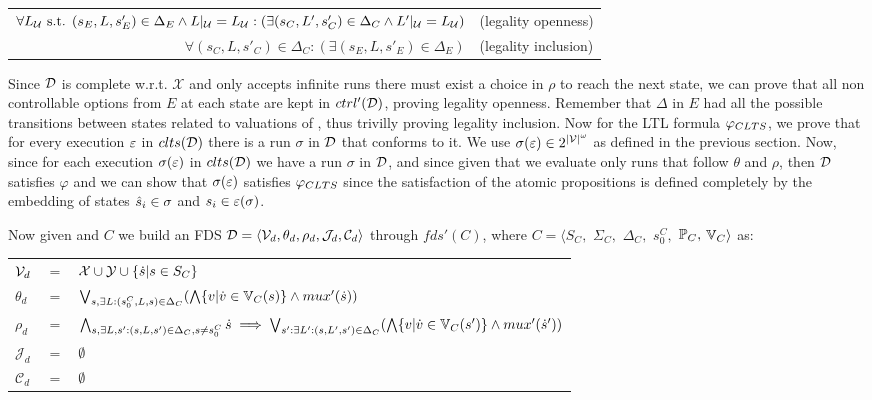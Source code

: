 \begin{center}
	\begin{tabular}{r l}
		
		$\forall L_{\mathcal{U}}\text{ s.t. }(s_E, L, s'_E) \in \Delta_E \wedge L|_{\mathcal{U}} = L_{\mathcal{U}}:( \exists (s_C, L', s'_C) \in \Delta_C \wedge L'|_{\mathcal{U}} = L_{\mathcal{U}})$ &(legality openness)\\
		$\forall (s_C, L, s'_C) \in \Delta_C: ( \exists (s_E, L, s'_E) \in \Delta_E)$& (legality inclusion)\\
	\end{tabular}
\end{center}

Since $\mathcal{D}$ is complete w.r.t. $\mathcal{X}$ and only accepts infinite runs there must exist a choice in $\rho$ to reach the next state, we can prove that all non controllable options from $E$ at each state are kept in $ctrl'(\mathcal{D})$, proving legality openness. Remember that $\Delta$ in $E$ had all the possible transitions between states related to valuations of \gsV, thus trivilly proving legality inclusion.
Now for the LTL formula $\varphi_{CLTS}$, we prove that for every execution $\varepsilon$ in $clts(\mathcal{D})$ there is a run $\sigma$ in $\mathcal{D}$ that conforms to it. We use $\sigma(\varepsilon) \in 2^{|\mathcal{V}|^{\omega}}$ as defined in the previous section.
Now, since for each execution $\sigma(\varepsilon)$ in $clts(\mathcal{D})$ we have a run $\sigma$ in $\mathcal{D}$, and since given that we evaluate only runs that follow $\theta$ and $\rho$, then $\mathcal{D}$ satisfies $\varphi$ and we can show that $\sigma(\varepsilon)$ satisfies $\varphi_{CLTS}$ since the satisfaction of the atomic propositions is defined completely by the embedding of states $\hat{s}_{i} \in \sigma$ and $s_i \in \varepsilon(\sigma)$.

Now given \cltsCPEmbeddingDef and $C$ we build an FDS $\mathcal{D}=\langle \mathcal V_d, \theta_d, \rho_d, \mathcal{J}_d, \mathcal{C}_d \rangle$ through $fds'(C)$, where $C=\langle S_C,$ $\Sigma_C,$ $\Delta_C,$ $s_0^C,$ $\mathbb{P}_C,$ $\mathbb{V}_C\rangle$ as:

\begin{tabular}{ l c l }
	${\mathcal{V}}_d$ & $=$ & ${\mathcal{X}} \cup {\ensuremath{\mathcal{Y}}} \cup \{\dot{s}| s \in S_C\}$\\	
	$\theta_d$ & $=$ & $\bigvee_{s,\exists L:(s_0^C,L,s)\in\Delta_C}(\bigwedge\{ v | \dot{v}\in \mathbb{V}_C(s)\}\wedge mux'(\dot{s}) )$\\
	$\rho_d$ & $=$ &$\bigwedge_{s,\exists L,s':(s,L,s')\in \Delta_C, s\neq s_0^C}\dot{s}\implies\bigvee_{s':\exists L':(s,L',s')\in \Delta_C}(\bigwedge\{v | \dot{v}\in \mathbb{V}_C(s') \}\wedge mux'(\dot{s}'))$\\	
	$\mathcal{J}_d$ & $=$ & $\emptyset$\\
	$\mathcal{C}_d$ & $=$ & $\emptyset$\\
\end{tabular}

